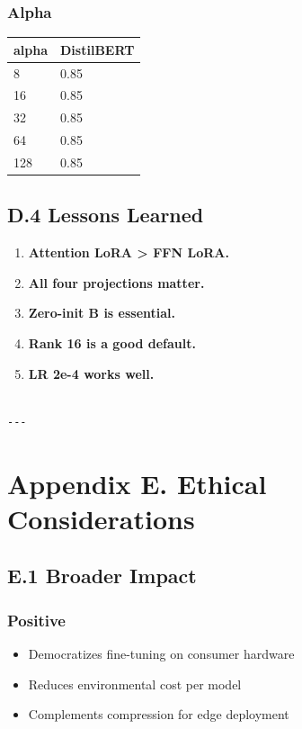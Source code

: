 \subsubsection{Alpha}

\begin{table}[H]
\centering
\small
\begin{tabular}{ll}
\toprule
\textbf{alpha} & \textbf{DistilBERT} \\
\midrule
8 & 0.85 \\
16 & 0.85 \\
32 & 0.85 \\
64 & 0.85 \\
128 & 0.85 \\
\bottomrule
\end{tabular}
\end{table}

\subsection{D.4 Lessons Learned}

\begin{enumerate}
\item \textbf{Attention LoRA > FFN LoRA.}
\item \textbf{All four projections matter.}
\item \textbf{Zero-init B is essential.}
\item \textbf{Rank 16 is a good default.}
\item \textbf{LR 2e-4 works well.}
\end{enumerate}
\begin{lstlisting}

---
\end{lstlisting}

\section{Appendix E. Ethical Considerations}

\subsection{E.1 Broader Impact}

\subsubsection{Positive}
\begin{itemize}
\item Democratizes fine-tuning on consumer hardware
\item Reduces environmental cost per model
\item Complements compression for edge deployment

\end{itemize}
